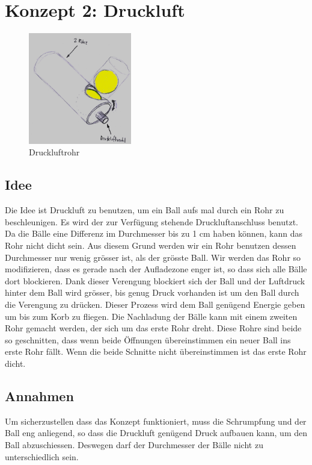 \section{Konzept 2: Druckluft}
\begin{figure}[h!]
	\centering
	\includegraphics[width=0.4\textwidth]{../../fig/Druckluftrohr.jpg}
	\caption{Druckluftrohr}
	\label{fig:druckluftrohr}
\end{figure}

\subsection{Idee}
Die Idee ist Druckluft zu benutzen, um ein Ball aufs mal durch ein Rohr zu beschleunigen. Es wird der zur Verfügung stehende Druckluftanschluss benutzt. Da die Bälle eine Differenz im Durchmesser bis zu 1 cm haben können, kann das Rohr nicht dicht sein. Aus diesem Grund werden wir ein Rohr benutzen dessen Durchmesser nur wenig grösser ist, als der grösste Ball. Wir werden das Rohr so modifizieren, dass es gerade nach der Aufladezone enger ist, so dass sich alle Bälle dort blockieren. Dank dieser Verengung blockiert sich der Ball und der Luftdruck hinter dem Ball wird grösser, bis genug Druck vorhanden ist um den Ball durch die Verengung zu drücken. Dieser Prozess wird dem Ball genügend Energie geben um bis zum Korb zu fliegen.
Die Nachladung der Bälle kann mit einem zweiten Rohr gemacht werden, der sich um das erste Rohr dreht. Diese Rohre sind beide so geschnitten, dass wenn beide Öffnungen übereinstimmen ein neuer Ball ins erste Rohr fällt. Wenn die beide Schnitte nicht übereinstimmen ist das erste Rohr dicht.

\subsection{Annahmen}
Um sicherzustellen dass das Konzept funktioniert, muss die Schrumpfung und der Ball eng anliegend, so dass die Druckluft genügend Druck aufbauen kann, um den Ball abzuschiessen. Deswegen darf der Durchmesser der Bälle nicht zu unterschiedlich sein. 

